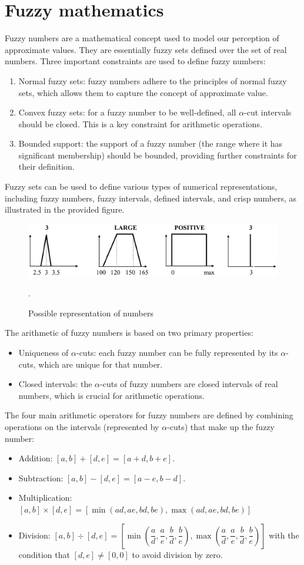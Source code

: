 \section{Fuzzy mathematics}

Fuzzy numbers are a mathematical concept used to model our perception of approximate values. 
They are essentially fuzzy sets defined over the set of real numbers. 
Three important constraints are used to define fuzzy numbers:
\begin{enumerate}
    \item Normal fuzzy sets: fuzzy numbers adhere to the principles of normal fuzzy sets, which allows them to capture the concept of approximate value.
    \item Convex fuzzy sets: for a fuzzy number to be well-defined, all $\alpha$-cut intervals should be closed. This is a key constraint for arithmetic operations.
    \item Bounded support: the support of a fuzzy number (the range where it has significant membership) should be bounded, providing further constraints for their definition.
\end{enumerate}
Fuzzy sets can be used to define various types of numerical representations, including fuzzy numbers, fuzzy intervals, defined intervals, and crisp numbers, as illustrated in the provided figure.
\begin{figure}[H]
    \centering
    \includegraphics[width=0.75\linewidth]{images/numbers.png}
    \caption{Possible representation of numbers}.
\end{figure}
The arithmetic of fuzzy numbers is based on two primary properties:
\begin{itemize}
    \item Uniqueness of $\alpha$-cuts: each fuzzy number can be fully represented by its $\alpha$-cuts, which are unique for that number.
    \item Closed intervals: the $\alpha$-cuts of fuzzy numbers are closed intervals of real numbers, which is crucial for arithmetic operations.
\end{itemize}
The four main arithmetic operators for fuzzy numbers are defined by combining operations on the intervals (represented by $\alpha$-cuts) that make up the fuzzy number:
\begin{itemize}
    \item Addition: $[a,b]+[d,e]=[a+d,b+e]$.
    \item Subtraction: $[a,b]-[d,e]=[a-e,b-d]$.
    \item Multiplication:  $[a,b] \times [d,e]=[\min (ad,ae,bd,be),\max (ad,ae,bd,be)]$
    \item Division: $[a,b] \div [d,e]=\left[\min \left(\dfrac{a}{d},\dfrac{a}{e},\dfrac{b}{d},\dfrac{b}{e}\right),\max \left(\dfrac{a}{d},\dfrac{a}{e},\dfrac{b}{d},\dfrac{b}{e}\right)\right]$ with the condition that $[d,e] \neq [0,0]$ to avoid division by zero.
\end{itemize}
